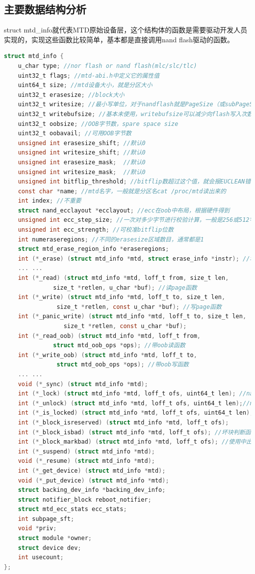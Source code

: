 \subsection{主要数据结构分析}
struct mtd\_info就代表MTD原始设备层，这个结构体的函数是需要驱动开发人员实现的，实现这些函数比较简单，基本都是直接调用nand flash驱动的函数。
\begin{lstlisting}[language=C]
struct mtd_info {
	u_char type; //nor flash or nand flash(mlc/slc/tlc)
	uint32_t flags; //mtd-abi.h中定义它的属性值
	uint64_t size; //mtd设备大小，就是分区大小
	uint32_t erasesize; //block大小
	uint32_t writesize; //最小写单位，对于nandflash就是PageSize（或subPageSize）
	uint32_t writebufsize; //基本未使用，writebufsize可以减少向flash写入次数
	uint32_t oobsize; //OOB字节数，spare space size
	uint32_t oobavail; //可用OOB字节数
	unsigned int erasesize_shift; //默认0
	unsigned int writesize_shift; //默认0
	unsigned int erasesize_mask;  //默认0
	unsigned int writesize_mask;  //默认0
	unsigned int bitflip_threshold; //bitflip数超过这个值，就会报EUCLEAN错误，这个值可以通过sysfs修改
	const char *name; //mtd名字，一般就是分区名cat /proc/mtd读出来的
	int index; //不重要
	struct nand_ecclayout *ecclayout; //ecc在oob中布局，根据硬件得到
	unsigned int ecc_step_size; //一次对多少字节进行校验计算，一般是256或512字节
	unsigned int ecc_strength; //可校准bitflip位数
	int numeraseregions; //不同的erasesize区域数目，通常都是1
	struct mtd_erase_region_info *eraseregions;
	int (*_erase) (struct mtd_info *mtd, struct erase_info *instr); //块擦除函数
	... ...
	int (*_read) (struct mtd_info *mtd, loff_t from, size_t len,
		      size_t *retlen, u_char *buf); //读page函数
	int (*_write) (struct mtd_info *mtd, loff_t to, size_t len,
		       size_t *retlen, const u_char *buf); //写page函数
	int (*_panic_write) (struct mtd_info *mtd, loff_t to, size_t len,
			     size_t *retlen, const u_char *buf);
	int (*_read_oob) (struct mtd_info *mtd, loff_t from,
			  struct mtd_oob_ops *ops); //带oob读函数
	int (*_write_oob) (struct mtd_info *mtd, loff_t to,
			   struct mtd_oob_ops *ops); //带oob写函数
	... ...
	void (*_sync) (struct mtd_info *mtd);
	int (*_lock) (struct mtd_info *mtd, loff_t ofs, uint64_t len); //nandflash支持设备独占访问才能定义
	int (*_unlock) (struct mtd_info *mtd, loff_t ofs, uint64_t len);//nandflash解锁
	int (*_is_locked) (struct mtd_info *mtd, loff_t ofs, uint64_t len);
	int (*_block_isreserved) (struct mtd_info *mtd, loff_t ofs);
	int (*_block_isbad) (struct mtd_info *mtd, loff_t ofs); //坏块判断函数
	int (*_block_markbad) (struct mtd_info *mtd, loff_t ofs); //使用中出现坏块时的标记函数
	int (*_suspend) (struct mtd_info *mtd);
	void (*_resume) (struct mtd_info *mtd);
	int (*_get_device) (struct mtd_info *mtd);
	void (*_put_device) (struct mtd_info *mtd);
	struct backing_dev_info *backing_dev_info;
	struct notifier_block reboot_notifier;
	struct mtd_ecc_stats ecc_stats;
	int subpage_sft;
	void *priv;
	struct module *owner;
	struct device dev;
	int usecount;
};

\end{lstlisting}
